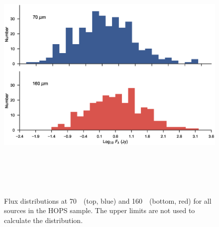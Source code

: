 \documentclass[manuscript]{aastex}
\begin{document}
\begin{figure}[ht]
\centering
\includegraphics[height=5in]{figures/LFs.eps}
\caption{Flux distributions at 70~\micron\ (top, blue) and 160~\micron\ (bottom, red) for all sources in the HOPS sample.  The upper limits are not used to calculate the distribution.\label{fig:fd}}
\end{figure}
\end{document}
